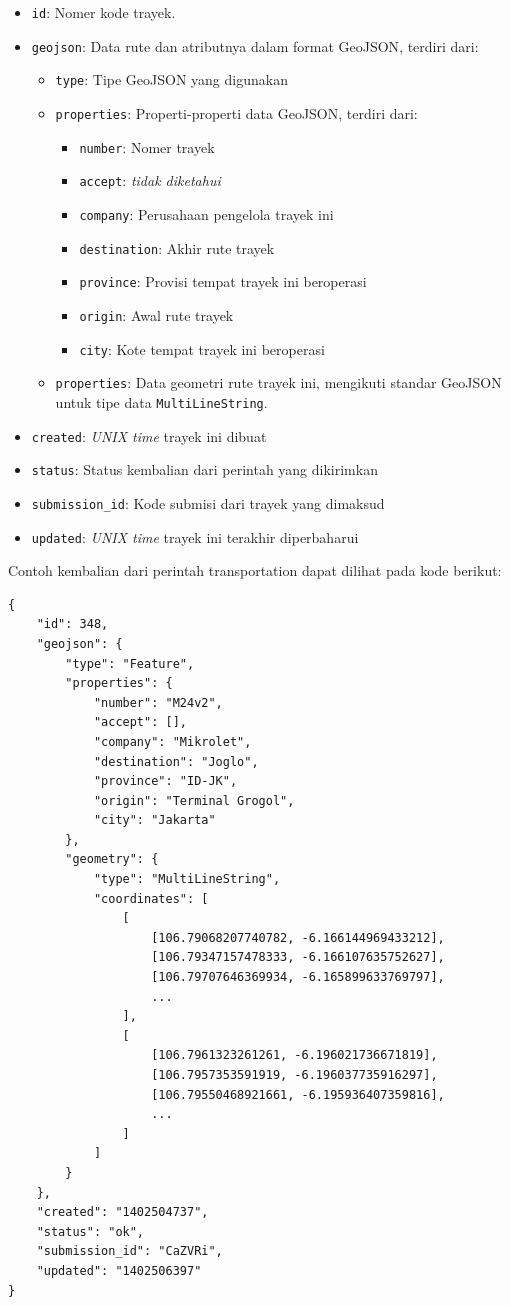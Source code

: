 \begin{itemize}
	\item \texttt{id}: Nomer kode trayek.
	\item \texttt{geojson}: Data rute dan atributnya dalam format
		GeoJSON\cite{geojson}, terdiri dari:
		\begin{itemize}
			\item \texttt{type}: Tipe GeoJSON yang digunakan
			\item \texttt{properties}: Properti-properti data GeoJSON, terdiri dari:
				\begin{itemize}
					\item \texttt{number}: Nomer trayek
					\item \texttt{accept}: \textit{tidak diketahui}
					\item \texttt{company}: Perusahaan pengelola trayek ini
					\item \texttt{destination}: Akhir rute trayek
					\item \texttt{province}: Provisi tempat trayek ini beroperasi
					\item \texttt{origin}: Awal rute trayek
					\item \texttt{city}: Kote tempat trayek ini beroperasi
				\end{itemize}
			\item \texttt{properties}: Data geometri rute trayek ini, mengikuti standar GeoJSON untuk tipe data \texttt{MultiLineString}.
		\end{itemize}
	\item \texttt{created}: \textit{UNIX time} trayek ini dibuat
	\item \texttt{status}: Status kembalian dari perintah yang dikirimkan
	\item \texttt{submission\_id}: Kode submisi dari trayek yang dimaksud
	\item \texttt{updated}: \textit{UNIX time} trayek ini terakhir diperbaharui
\end{itemize}

Contoh kembalian dari perintah transportation dapat dilihat pada kode berikut:

\begin{lstlisting}
{
	"id": 348,
	"geojson": {
		"type": "Feature",
		"properties": {
			"number": "M24v2",
			"accept": [],
			"company": "Mikrolet",
			"destination": "Joglo",
			"province": "ID-JK",
			"origin": "Terminal Grogol",
			"city": "Jakarta"
		},
		"geometry": {
			"type": "MultiLineString",
			"coordinates": [
				[
					[106.79068207740782, -6.166144969433212],
					[106.79347157478333, -6.166107635752627],
					[106.79707646369934, -6.165899633769797],
					...
				],
				[
					[106.7961323261261, -6.196021736671819],
					[106.7957353591919, -6.196037735916297],
					[106.79550468921661, -6.195936407359816],
					...
				]
			]
		}
	},
	"created": "1402504737",
	"status": "ok",
	"submission_id": "CaZVRi",
	"updated": "1402506397"
}
\end{lstlisting}
